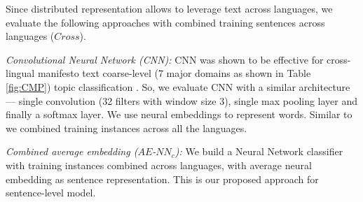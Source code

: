 \documentclass[11pt,a4paper]{article}
\begin{document}
Since distributed representation allows to leverage text across languages, we evaluate the following approaches with combined training sentences across languages ($Cross$).

\begin{description}
\item{\textit{Convolutional Neural Network (CNN):}} CNN was shown to be effective for cross-lingual manifesto text coarse-level (7 major domains as shown in Table \ref{fig:CMP}) topic classification \cite{W17-2906}. So, we evaluate CNN with a similar architecture --- single convolution (32 filters with window size 3), single max pooling layer and finally a softmax layer. We use neural embeddings to represent words. Similar to \cite{W17-2906} we combined training instances across all the languages.
\item{\textit{Combined average embedding ($AE$-$NN_{c}$):}} We build a Neural Network classifier with training instances combined across languages, with average neural embedding as sentence representation. This is our proposed approach for sentence-level model.
\end{description}
\end{document}

